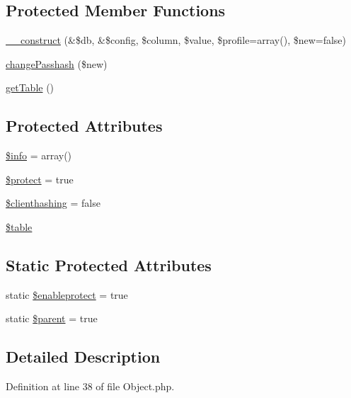 \subsection*{Protected Member Functions}
\begin{DoxyCompactItemize}
\item 
\hyperlink{classDB__Object_a7e3792ecc489d4039ecef05574005aae}{\_\-\_\-construct} (\&\$db, \&\$config, \$column, \$value, \$profile=array(), \$new=false)
\item 
\hyperlink{classDB__Object_a3f370bd811dc4f984150f220a5a7fd1c}{changePasshash} (\$new)
\item 
\hyperlink{classDB__Object_a9924a8fa716e352e9528bf99f51a90fd}{getTable} ()
\end{DoxyCompactItemize}
\subsection*{Protected Attributes}
\begin{DoxyCompactItemize}
\item 
\hyperlink{classDB__Object_adec88cd7f52f2cbe98d4568c86d1e172}{\$info} = array()
\item 
\hyperlink{classDB__Object_ae7ffc7d66d72066f8333048851ef6926}{\$protect} = true
\item 
\hyperlink{classDB__Object_a5ba1c6aa344fb0a4f91da7095105ee72}{\$clienthashing} = false
\item 
\hyperlink{classDB__Object_a0d08820dae7ab434119115781b369714}{\$table}
\end{DoxyCompactItemize}
\subsection*{Static Protected Attributes}
\begin{DoxyCompactItemize}
\item 
static \hyperlink{classDB__Object_a4b05c22c55cb43234cc80dd35b1d542b}{\$enableprotect} = true
\item 
static \hyperlink{classDB__Object_abc24dbdab0d6a65f2f775ae46d0c4a59}{\$parent} = true
\end{DoxyCompactItemize}


\subsection{Detailed Description}


Definition at line 38 of file Object.php.

